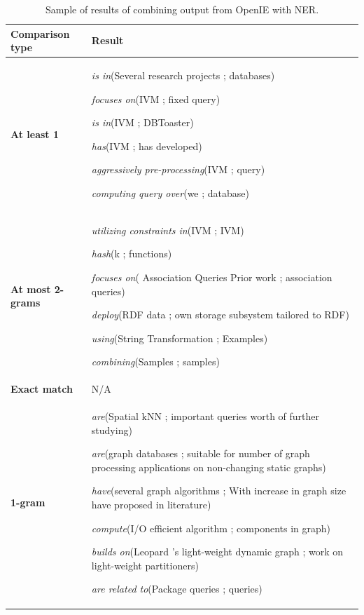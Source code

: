 \documentclass[11pt,a4paper,openright]{memoir}
\begin{document}
\begin{table}[!htbp]
  \centering
  \tiny
    \begin{tabular}{|m{2cm}|m{7cm}|}
\hline

\textbf{Comparison type} &
\textbf{Result} \\
\hline

\textbf{At least 1}  &
\emph{is in}(Several research projects ; databases)  

\emph{focuses on}(IVM ; ﬁxed query)  

\emph{is in}(IVM ; DBToaster)  

\emph{has}(IVM ; has developed)  

\emph{aggressively pre-processing}(IVM ; query)  

\emph{computing query over}(we ; database)  

 \\
\hline

\textbf{At most 2-grams}  &

\emph{utilizing constraints in}(IVM ; IVM)

\emph{hash}(k ; functions)

\emph{focuses on}( Association Queries Prior work ; association queries)

\emph{deploy}(RDF data ; own storage subsystem tailored to RDF)

\emph{using}(String Transformation ; Examples)

\emph{combining}(Samples ; samples)


 \\
\hline

\textbf{Exact match}  &

N/A

 \\
\hline

\textbf{1-gram}  &

\emph{are}(Spatial kNN ; important queries worth of further studying)

\emph{are}(graph databases ; suitable for number of graph processing applications on non-changing static graphs)

\emph{have}(several graph algorithms ; With increase in graph size have proposed in literature)

\emph{compute}(I/O efficient algorithm ; components in graph)

\emph{builds on}(Leopard 's light-weight dynamic graph ; work on light-weight partitioners)

\emph{are related to}(Package queries ; queries) \\

\hline
    \end{tabular}
  \caption[Sample of results of combining output from OpenIE with NER.]{Sample of results of combining output from OpenIE with NER.}
  \label{tab:ngram_comparison_results}
\end{table}
\end{document}
